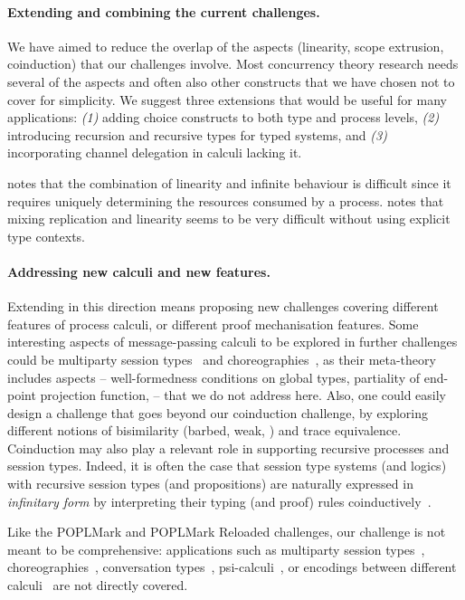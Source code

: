 \documentclass[runningheads]{llncs}
\begin{document}
\paragraph{Extending and combining the current challenges.}
We have aimed to reduce the overlap of the aspects (linearity, scope extrusion, coinduction) that our challenges involve.
Most concurrency theory research needs several of the aspects and often also other constructs that we have chosen not to cover for simplicity.
We suggest three extensions that would be useful for many applications:
\emph{(1)} adding choice constructs to both type and process levels,
\emph{(2)} introducing recursion and recursive types for typed systems, and
\emph{(3)} incorporating channel delegation in calculi lacking it.

\cite{DBLP:conf/forte/ZalakainD21} notes that the combination of linearity and infinite behaviour is difficult since it requires uniquely determining the resources consumed by a process.
\cite{Zalakain2019} notes that mixing replication and linearity seems to be very difficult without using explicit type contexts.

\paragraph{Addressing new calculi and new features.}
Extending in this direction means proposing new challenges covering different features of process calculi, or different proof mechanisation features.
Some interesting aspects of message-passing calculi to be explored in further challenges could be multiparty session types~\cite{10.1145/2827695} and choreographies~\cite{Carbone2013}, as their meta-theory includes aspects -- \eg well-formedness conditions on global types, partiality of end-point projection function, \etc -- that we do not address here.
Also, one could easily design a challenge that goes beyond our coinduction challenge, by exploring different notions of bisimilarity (barbed, weak, \etc) and trace equivalence.
%
Coinduction may also play a relevant role in supporting recursive processes and
session types. Indeed, it is often the case that session type systems (and
logics) with recursive session types (and propositions) are naturally expressed
in \emph{infinitary form} by interpreting their typing (and proof) rules
coinductively~\cite{BaeldeDoumaneSaurin16,DerakhshanPfenning22,HornePadovani23}.

Like the POPLMark and POPLMark Reloaded challenges, our challenge is
not meant to be comprehensive: applications such as multiparty session
types~\cite{10.1145/2827695,10.1145/3290343},
choreographies~\cite{DBLP:journals/jar/CruzFilipeMP23}, conversation
types~\cite{DBLP:journals/tcs/CairesV10}, psi-calculi~\cite{lmcs:696},
or encodings between different
calculi~\cite{DBLP:journals/iandc/Gorla10, DBLP:conf/ecoop/ScalasDHY17} are not directly covered.
\end{document}
